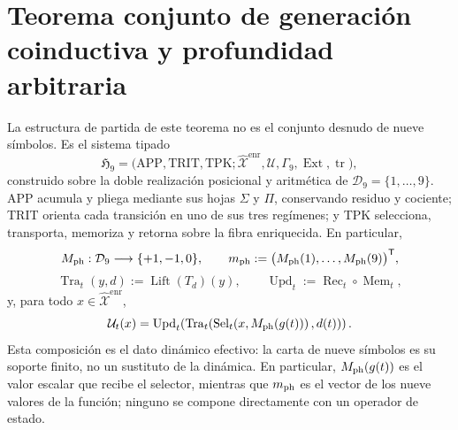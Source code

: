 
\section{Teorema conjunto de generación coinductiva y profundidad arbitraria}
\label{sec:c27-generacion-coinductiva-profundidad-arbitraria}

La estructura de partida de este teorema no es el conjunto desnudo de nueve
símbolos. Es el sistema tipado
\[
 \mathfrak H_9=
 \bigl(\mathrm{APP},\mathrm{TRIT},\mathrm{TPK};
       \widehat{\mathcal X}^{\mathrm{enr}},\mathcal U,
       \Gamma_9,\operatorname{Ext},\operatorname{tr}\bigr),
\]
construido sobre la doble realización posicional y aritmética de
\(\mathcal D_9=\{1,\ldots,9\}\). APP acumula y pliega mediante sus hojas
\(\Sigma\) y \(\Pi\), conservando residuo y cociente; TRIT orienta cada
transición en uno de sus tres regímenes; y TPK selecciona, transporta,
memoriza y retorna sobre la fibra enriquecida. En particular,
\[
 M_{\rm ph}:\mathcal D_9\longrightarrow\{+1,-1,0\},
 \qquad
 m_{\rm ph}:=\bigl(M_{\rm ph}(1),\ldots,M_{\rm ph}(9)\bigr)^{\mathsf T},
\]
\[
 \operatorname{Tra}_t(y,d):=\operatorname{Lift}(T_d)(y),
 \qquad
 \operatorname{Upd}_t:=\operatorname{Rec}_t\circ\operatorname{Mem}_t,
\]
y, para todo \(x\in\widehat{\mathcal X}^{\mathrm{enr}}\),
\[
 \mathcal U_t(x)
 =\operatorname{Upd}_t\!\left(
   \operatorname{Tra}_t\!\left(
    \operatorname{Sel}_t\!\left(x,M_{\rm ph}(g(t))\right),d(t)
   \right)\right).
\]
Esta composición es el dato dinámico efectivo: la carta de nueve símbolos
es su soporte finito, no un sustituto de la dinámica. En particular,
\(M_{\rm ph}(g(t))\) es el valor escalar que recibe el selector, mientras
que \(m_{\rm ph}\) es el vector de los nueve valores de la función; ninguno
se compone directamente con un operador de estado.

